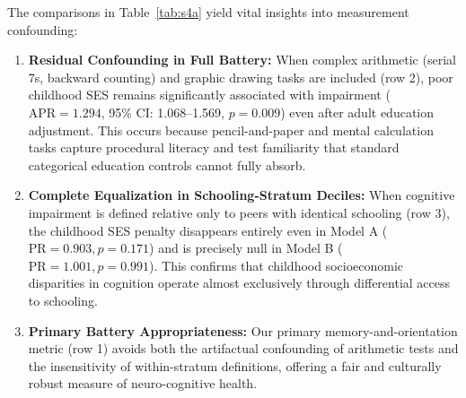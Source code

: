 \begin{table}[!htbp]
\centering
\small
\caption{\textbf{Sensitivity to Cognitive Outcome Definition: Prevalence Ratios (95\% CI) for Poor Childhood SES (vs. Well-off).}}
\label{tab:s4a}
\end{table}

The comparisons in Table~\ref{tab:s4a} yield vital insights into measurement confounding:
\begin{enumerate}
    \item \textbf{Residual Confounding in Full Battery:} When complex arithmetic (serial 7s, backward counting) and graphic drawing tasks are included (row 2), poor childhood SES remains significantly associated with impairment ($\text{APR} = 1.294$, 95\% CI: 1.068--1.569, $p = 0.009$) even after adult education adjustment. This occurs because pencil-and-paper and mental calculation tasks capture procedural literacy and test familiarity that standard categorical education controls cannot fully absorb.
    \item \textbf{Complete Equalization in Schooling-Stratum Deciles:} When cognitive impairment is defined relative only to peers with identical schooling (row 3), the childhood SES penalty disappears entirely even in Model A ($\text{PR} = 0.903, p = 0.171$) and is precisely null in Model B ($\text{PR} = 1.001, p = 0.991$). This confirms that childhood socioeconomic disparities in cognition operate almost exclusively through differential access to schooling.
    \item \textbf{Primary Battery Appropriateness:} Our primary memory-and-orientation metric (row 1) avoids both the artifactual confounding of arithmetic tests and the insensitivity of within-stratum definitions, offering a fair and culturally robust measure of neuro-cognitive health.
\end{enumerate}


